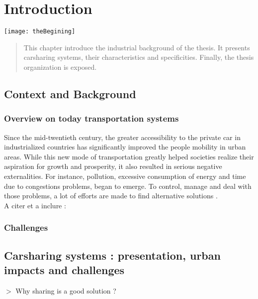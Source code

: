 \chapter{Introduction} \label{chap:introduction}
\begin{bibunit}[ieeetr]
\minitoc
\vspace{2cm}
%
\noindent
\begin{minipage}[c]{0.45\textwidth}
\texttt{[image: theBegining]}
\end{minipage}
\hfill
\begin{minipage}[c]{0.45\textwidth}
\begin{abstract}
This chapter introduce the industrial background of the thesis.
It presents carsharing systems, their characteristics and specificities.
Finally, the thesis organization is exposed.
\end{abstract}
\end{minipage}

\newpage
\section{Context and Background}
\subsection{Overview on today transportation systems}
Since the mid-twentieth century, the greater accessibility to the private car in industrialized countries has significantly improved the people mobility in urban areas. 
While this new mode of transportation greatly helped societies realize their aspiration for growth and prosperity, it also resulted in serious negative externalities.
For instance, pollution, excessive consumption of energy and time due to congestions problems, began to emerge.
To control, manage and deal with those problems, a lot of efforts are made to find alternative solutions \cite{mitchell_reinventing_2010}.\\

A citer et a inclure : \cite{le_vine_carsharing_2014}

\subsection{Challenges}

\section{Carsharing systems : presentation, urban impacts and challenges}
$>$ Why sharing is a good solution ?


\end{bibunit}
